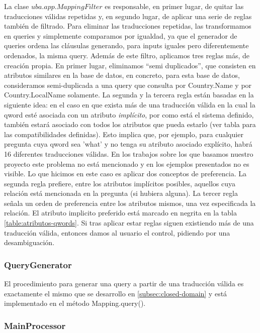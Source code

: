 La clase $uba.app.MappingFilter$ es responsable, en primer lugar, de quitar las traducciones válidas repetidas y, en segundo lugar, de aplicar una serie de reglas también de filtrado. Para eliminar las traducciones repetidas, las transformamos en queries y simplemente comparamos por igualdad, ya que el generador de queries ordena las cláusulas generando, para inputs iguales pero diferentemente ordenados, la misma query.
Además de este filtro, aplicamos tres reglas más, de creación propia. En primer lugar, eliminamos ``semi duplicados'', que consisten en atributos similares en la base de datos, en concreto, para esta base de datos, consideramos semi-duplicada a una query que consulta por Country.Name y por Country.LocalName solamente. La segunda y la tercera regla están basadas en la siguiente idea: en el caso en que exista más de una traducción válida en la cual la qword esté asociada con un atributo \textit{implícito}, por como está el sistema definido, también estará asociado con todos los atributos que pueda estarlo (ver tabla  para las compatibilidades definidas). Esto implica que, por ejemplo, para cualquier pregunta cuya qword sea 'what' y no tenga su atributo asociado explícito, habrá 16 diferentes traducciones válidas. En los trabajos sobre los que basamos nuestro proyecto este problema no está mencionado y en los ejemplos presentados no es visible. Lo que hicimos en este caso es aplicar dos conceptos de preferencia. La segunda regla prefiere, entre los atributos implícitos posibles, aquellos cuya relación está mencionada en la pregunta (si hubiera alguna). La tercer regla señala un orden de preferencia entre los atributos mismos, una vez especificada la relación. El atributo implicito preferido está marcado en negrita en la tabla \ref{table:atributos-qwords}. Si tras aplicar estar reglas siguen existiendo más de una traducción válida, entonces damos al usuario el control, pidiendo por una desambiguación.


\subsubsection*{QueryGenerator}
\label{subsubsec:query-generator}

El procedimiento para generar una query a partir de una traducción válida es exactamente el mismo que se desarrollo en \ref{subsec:closed-domain} y está implementado en el método Mapping.query().


\subsubsection*{MainProcessor}
\label{subsubsec:main-processor}

